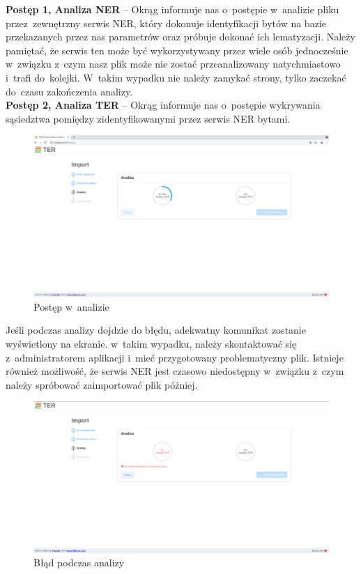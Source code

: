 \documentclass[12pt, a4paper]{article}
\begin{document}
\noindent\textbf{Postęp 1, Analiza NER} -- Okrąg informuje nas o~postępie w~analizie pliku przez~zewnętrzny serwis NER, który dokonuje identyfikacji bytów na bazie przekazanych przez nas parametrów oraz próbuje dokonać ich lematyzacji. Należy pamiętać, że serwis ten może być wykorzystywany przez wiele osób jednocześnie w~związku z~czym nasz plik może nie zostać przeanalizowany natychmiastowo i~trafi do~kolejki. W~takim wypadku nie należy zamykać strony, tylko zaczekać do~czasu zakończenia analizy.\\

\noindent\textbf{Postęp 2, Analiza TER} -- Okrąg informuje nas o~postępie wykrywania sąsiedztwa pomiędzy zidentyfikowanymi przez serwis NER bytami.

\begin{figure}[H]
  \centering
  \includegraphics[width=\linewidth]{images/analiza-w-trakcie.png}
  \caption{Postęp w~analizie}
\end{figure}

Jeśli podczas analizy dojdzie do błędu, adekwatny komunikat zostanie wyświetlony na ekranie. w~takim wypadku, należy skontaktować się z~administratorem aplikacji i~mieć przygotowany problematyczny plik. Istnieje również możliwość, że serwis NER jest czasowo niedostępny w~związku z~czym należy spróbować zaimportować plik później.

\begin{figure}[H]
  \centering
  \includegraphics[width=\linewidth]{images/analiza-error.png}
  \caption{Błąd podczas analizy}
\end{figure}
\end{document}
